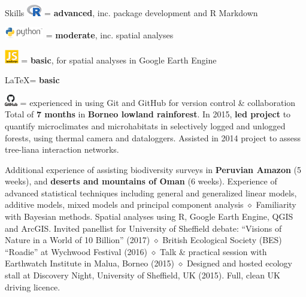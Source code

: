 
\begin{rubric}{Skills}
    \includegraphics[height=0.5cm]{Rlogo.png} = \textbf {advanced}, inc. package development and R Markdown
    \par \includegraphics[height=0.5cm]{python-logo.png} = \textbf{moderate}, inc. spatial analyses
    \par \includegraphics[height=0.6cm]{javascript-logo.jpg} = \textbf{basic}, for spatial analyses in Google Earth Engine
    \par \LaTeX = \textbf{basic}
    \par \includegraphics[height=0.5cm]{github-logo.png} = experienced in using Git and GitHub for version control \& collaboration
\entry*[Fieldwork]
    Total of \textbf{7 months} in \textbf{Borneo lowland rainforest}. In 2015, \textbf{led project} to quantify microclimates and microhabitats in selectively logged and unlogged forests, using thermal camera and dataloggers. Assisted in 2014 project to assess tree-liana interaction networks.
    \par \hfill
    \par Additional experience of assisting biodiversity surveys in \textbf{Peruvian Amazon} (5 weeks), and \textbf{deserts and mountains of Oman} (6 weeks).
	Experience of advanced statistical techniques including general and generalized linear models, additive models, mixed models and principal component analysis $\diamond$ Familiarity with Bayesian methods.
\entry*[GIS]
	Spatial analyses using R, Google Earth Engine, QGIS and ArcGIS.
	Invited panellist for University of Sheffield debate: ``Visions of Nature in a World of 10 Billion'' (2017) $\diamond$ British Ecological Society (BES) ``Roadie'' at Wychwood Festival (2016) $\diamond$ Talk \& practical session with Earthwatch Institute in Malua, Borneo (2015) $\diamond$ Designed and hosted ecology stall at Discovery Night, University of Sheffield, UK (2015).
\entry*[Driving]
	Full, clean UK driving licence.
\end{rubric}

